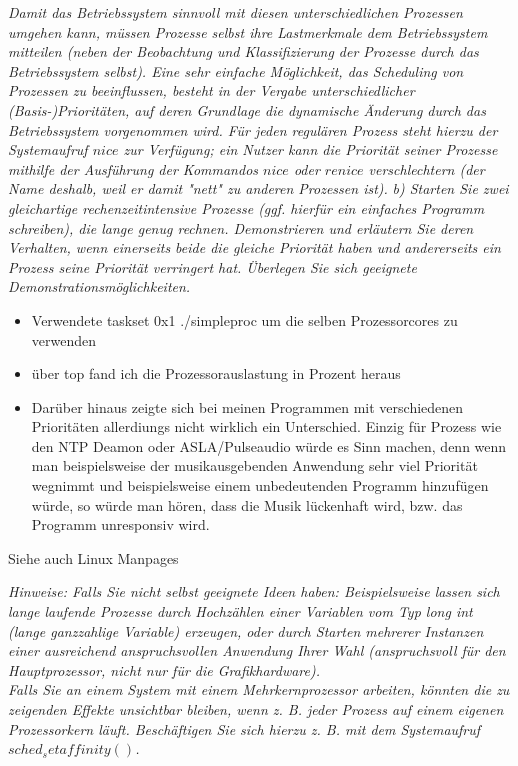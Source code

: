 \documentclass[a4paper]{article}
\begin{document}
\textit{Damit das Betriebssystem sinnvoll mit diesen unterschiedlichen Prozessen umgehen kann, müssen Prozesse selbst ihre Lastmerkmale dem Betriebssystem mitteilen (neben der Beobachtung und Klassifizierung der Prozesse durch das Betriebssystem selbst). Eine sehr einfache Möglichkeit, das Scheduling von Prozessen zu beeinflussen, besteht in der Vergabe unterschiedlicher (Basis-)Prioritäten, auf deren Grundlage die dynamische Änderung durch das Betriebssystem vorgenommen wird. Für jeden regulären Prozess steht hierzu der Systemaufruf $nice$ zur Verfügung; ein Nutzer kann die Priorität seiner Prozesse mithilfe der Ausführung
    der Kommandos $nice$ oder $renice$ verschlechtern (der Name deshalb, weil er damit "nett" zu anderen Prozessen ist).}
\vspace{10mm}
\textit{b) Starten Sie zwei gleichartige rechenzeitintensive Prozesse (ggf. hierfür ein einfaches Programm schreiben), die lange genug rechnen. Demonstrieren und erläutern Sie deren Verhalten, wenn einerseits beide die gleiche Priorität haben und andererseits ein Prozess seine Priorität verringert hat. Überlegen Sie sich geeignete Demonstrationsmöglichkeiten.}
\vspace{10mm}

\begin{itemize}
    \item Verwendete taskset 0x1 ./simpleproc um die selben Prozessorcores zu verwenden
    \item über top fand ich die Prozessorauslastung in Prozent heraus
    \item Darüber hinaus zeigte sich bei meinen Programmen mit verschiedenen Prioritäten allerdiungs nicht wirklich ein Unterschied. Einzig für Prozess wie den NTP Deamon oder ASLA/Pulseaudio würde es Sinn machen, denn wenn man beispielsweise der musikausgebenden Anwendung sehr viel Priorität wegnimmt und beispielsweise einem unbedeutenden Programm hinzufügen würde, so würde man hören, dass die Musik lückenhaft wird, bzw. das Programm unresponsiv wird.
\end{itemize}
Siehe auch Linux Manpages

\textit{
    Hinweise:
    Falls Sie nicht selbst geeignete Ideen haben: Beispielsweise lassen sich lange laufende Prozesse durch Hochzählen einer Variablen vom Typ long int (lange ganzzahlige Variable) erzeugen, oder durch Starten mehrerer Instanzen einer ausreichend anspruchsvollen Anwendung Ihrer Wahl (anspruchsvoll für den Hauptprozessor, nicht nur für die Grafikhardware).\\
    Falls Sie an einem System mit einem Mehrkernprozessor arbeiten, könnten die zu zeigenden Effekte unsichtbar bleiben, wenn z. B. jeder Prozess auf einem eigenen Prozessorkern läuft. Beschäftigen Sie sich hierzu z. B. mit dem Systemaufruf $sched_setaffinity()$.
}
\vspace{10mm}
\end{document}
